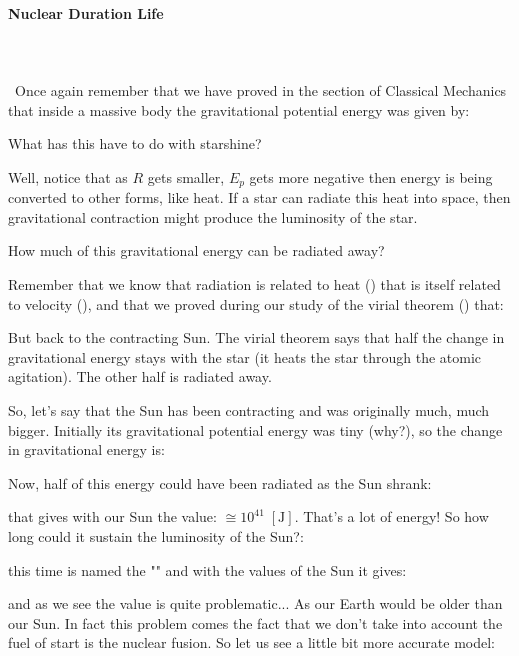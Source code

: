 	\paragraph{Nuclear Duration Life}\mbox{}\\\\\
	Once again remember that we have proved in the section of Classical Mechanics that inside a massive body the gravitational potential energy was given by:
	
	What has this have to do with starshine?

	Well, notice that as $R$ gets smaller, $E_p$ gets more negative then energy is being converted to other forms, like heat. If a star can radiate this heat into space, then gravitational contraction might produce the luminosity of the star.
	
	How much of this gravitational energy can be radiated away? 
	
	Remember that we know that radiation is related to heat () that is itself related to velocity (), and that we proved during our study of the virial theorem () that:
	 
	But back to the contracting Sun. The virial theorem says that half the change in gravitational energy stays with the star (it heats the star through the atomic agitation). The other half is radiated away.
	
	So, let's say that the Sun has been contracting and was originally much, much bigger.  Initially its gravitational potential energy was tiny (why?), so the change in gravitational energy is:
	
	Now, half of this energy could have been radiated as the Sun shrank:
	
	that gives with our Sun the value: $\cong 10^{41}\;[\text{J}]$. That's a lot of energy! So how long could it sustain the luminosity of the Sun?:
	
	this time is named the "" and with the values of the Sun it gives:
	
	and as we see the value is quite problematic... As our Earth would be older than our Sun. In fact this problem comes the fact that we don't take into account the fuel of start is the nuclear fusion. So let us see a little bit more accurate model:
	
